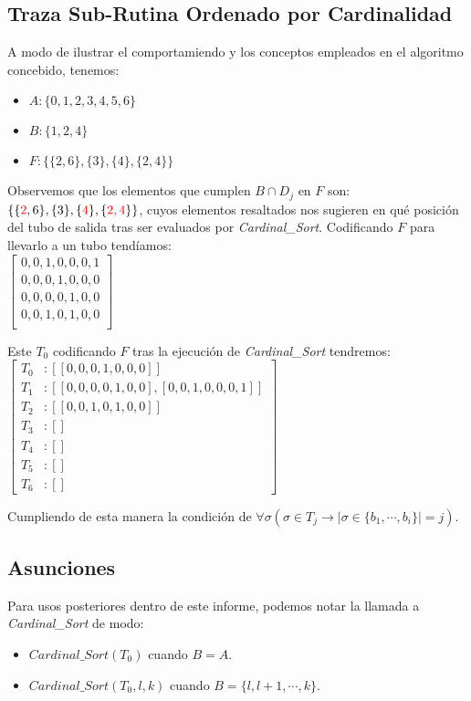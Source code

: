 \documentclass[12pt, letterpaper, twoside]{article}
\begin{document}
    \subsection{Traza Sub-Rutina Ordenado por Cardinalidad}
    \par A modo de ilustrar el comportamiendo y los conceptos empleados en el algoritmo concebido, tenemos:
    \begin{itemize}
        \item $A: \{0, 1, 2, 3, 4, 5, 6\}$
        \item $B: \{1, 2, 4\}$
        \item $F: \{\{2, 6\}, \{3\}, \{4\}, \{2, 4\}\}$
    \end{itemize}
    \par Observemos que los elementos que cumplen $B\cap D_j$ en $F$ son: $\{\{\textcolor{red}{2}, 6\}, \{3\}, \{\textcolor{red}{4}\}, \{\textcolor{red}{2, 4}\}\}$, cuyos elementos resaltados nos sugieren en qué posición del tubo de salida tras ser evaluados por \emph{Cardinal\_Sort}. Codificando $F$ para llevarlo a un tubo tendíamos: \\
    $
        \begin{bmatrix}
            0, 0, 1, 0, 0, 0, 1 \\
            0, 0, 0, 1, 0, 0, 0 \\
            0, 0, 0, 0, 1, 0, 0 \\
            0, 0, 1, 0, 1, 0, 0 \\
        \end{bmatrix}
    $
    \par Este $T_0$ codificando $F$ tras la ejecución de \emph{Cardinal\_Sort} tendremos: \\
    $
    \begin{bmatrix}
            T_0&: [[0, 0, 0, 1, 0, 0, 0]] \\
            T_1&: [[0, 0, 0, 0, 1, 0, 0], [0, 0, 1, 0, 0, 0, 1]] \\
            T_2&: [[0, 0, 1, 0, 1, 0, 0]] \\
            T_3&: [] \\
            T_4&: [] \\
            T_5&: [] \\
            T_6&: [] 
    \end{bmatrix}
    $
    \par Cumpliendo de esta manera la condición de $\forall\sigma(\sigma\in T_j \rightarrow|\sigma\in\{b_1,\cdots,b_i\}|=j)$.

    \subsection{Asunciones}
    \par Para usos posteriores dentro de este informe, podemos notar la llamada a \emph{Cardinal\_Sort} de modo:
    \begin{itemize}
        \item $Cardinal\_Sort(T_0)$ cuando $B=A$.
        \item $Cardinal\_Sort(T_0, l, k)$ cuando $B=\{l, l+1,\cdots,k\}$.
    \end{itemize}
\end{document}
